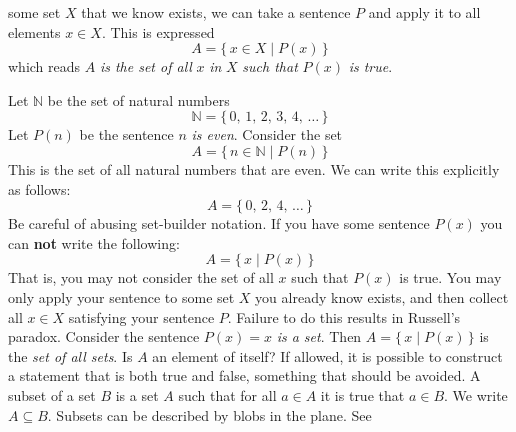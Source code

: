 \documentclass{article}
\theoremstyle{plain}
\theoremstyle{normal}
\newenvironment{example}{%
    \pushQED{\qed}\renewcommand{\qedsymbol}{$\blacksquare$}\examplex%
}{%
    \popQED\endexamplex%
}
\newenvironment{definition}{%
    \pushQED{\qed}\renewcommand{\qedsymbol}{$\blacksquare$}\definitionx%
}{%
    \popQED\enddefinitionx%
}
\begin{document}
        some set $X$ that we know exists, we can take a sentence $P$ and
        apply it to all elements $x\in{X}$.
        This is expressed
        \begin{equation}
            A=\{\,x\in{X}\;|\;P(x)\,\}
        \end{equation}
        which reads $A$ \textit{is the set of all} $x$ \textit{in} $X$
        \textit{such that} $P(x)$ \textit{is true}.
        \begin{example}
            Let $\mathbb{N}$ be the set of natural numbers
            \begin{equation}
                \mathbb{N}=\{\,0,\,1,\,2,\,3,\,4,\,\dots\,\}
            \end{equation}
            Let $P(n)$ be the sentence $n$ \textit{is even}. Consider the
            set
            \begin{equation}
                A=\{\,n\in\mathbb{N}\;|\;P(n)\,\}
            \end{equation}
            This is the set of all natural numbers that are even. We can write
            this explicitly as follows:
            \begin{equation}
                A=\{\,0,\,2,\,4,\,\dots\,\}
            \end{equation}
        \end{example}
        Be careful of abusing set-builder notation. If you have some sentence
        $P(x)$ you can \textbf{not} write the following:
        \begin{equation}
            A=\{\,x\;|\;P(x)\,\}
        \end{equation}
        That is, you may not consider the set of all $x$ such that $P(x)$ is
        true. You may only apply your sentence to some set $X$ you already
        know exists, and then collect all $x\in{X}$ satisfying your sentence
        $P$. Failure to do this results in Russell's paradox. Consider the
        sentence $P(x)=x$ \textit{is a set}. Then
        $A=\{\,x\;|\;P(x)\,\}$ is the \textit{set of all sets}. Is
        $A$ an element of itself? If allowed, it is possible to construct
        a statement that is both true and false, something that should be
        avoided.
        \begin{definition}[\textbf{Subset}]
            A subset of a set $B$ is a set $A$ such that for all $a\in{A}$
            it is true that $a\in{B}$. We write $A\subseteq{B}$.
        \end{definition}
        Subsets can be described by blobs in the plane. See
\end{document}
